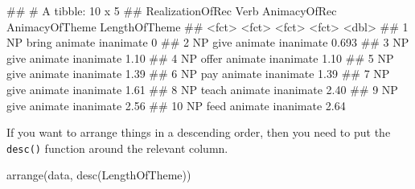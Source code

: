 \documentclass[
]{book}
\newenvironment{Shaded}{\begin{snugshade}}{\end{snugshade}}
\newcommand{\FunctionTok}[1]{\textcolor[rgb]{0.00,0.00,0.00}{#1}}
\newcommand{\NormalTok}[1]{#1}
\begin{document}
\begin{Shaded}
\begin{Highlighting}[]
\NormalTok{\#\# \# A tibble: 10 x 5}
\NormalTok{\#\#    RealizationOfRec Verb  AnimacyOfRec AnimacyOfTheme LengthOfTheme}
\NormalTok{\#\#    \textless{}fct\textgreater{}            \textless{}fct\textgreater{} \textless{}fct\textgreater{}        \textless{}fct\textgreater{}                  \textless{}dbl\textgreater{}}
\NormalTok{\#\#  1 NP               bring animate      inanimate              0    }
\NormalTok{\#\#  2 NP               give  animate      inanimate              0.693}
\NormalTok{\#\#  3 NP               give  animate      inanimate              1.10 }
\NormalTok{\#\#  4 NP               offer animate      inanimate              1.10 }
\NormalTok{\#\#  5 NP               give  animate      inanimate              1.39 }
\NormalTok{\#\#  6 NP               pay   animate      inanimate              1.39 }
\NormalTok{\#\#  7 NP               give  animate      inanimate              1.61 }
\NormalTok{\#\#  8 NP               teach animate      inanimate              2.40 }
\NormalTok{\#\#  9 NP               give  animate      inanimate              2.56 }
\NormalTok{\#\# 10 NP               feed  animate      inanimate              2.64}
\end{Highlighting}
\end{Shaded}

If you want to arrange things in a descending order, then you need to put the \texttt{desc()} function around the relevant column.

\begin{Shaded}
\begin{Highlighting}[]
\FunctionTok{arrange}\NormalTok{(data, }\FunctionTok{desc}\NormalTok{(LengthOfTheme))}
\end{Highlighting}
\end{Shaded}
\end{document}
